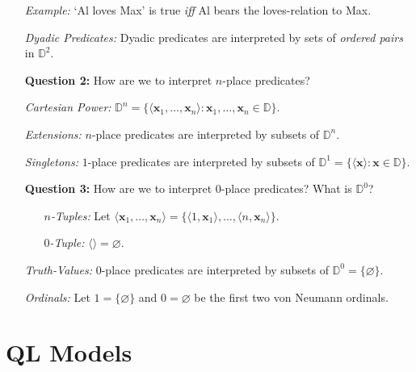 \documentclass[a4paper, 11pt]{article} %
\newcommand{\tuple}[1]{\langle#1\rangle} %
\newcommand{\set}[1]{\lbrace#1\rbrace} %
\newcommand{\D}{\mathbb{D}}
\renewcommand{\v}[1]{\mathbf{#1}}
\begin{document}
\begin{enumerate}
  \item[\it Example:] `Al loves Max' is true \textit{iff} Al bears the loves-relation to Max.
  \item[\it Dyadic Predicates:] Dyadic predicates are interpreted by sets of \textit{ordered pairs} in $\D^2$.
  \item[\bf Question 2:] How are we to interpret $n$-place predicates?
  \item[\it Cartesian Power:] $\D^n=\set{\tuple{\v{x}_1,\ldots,\v{x}_n}:\v{x}_1,\ldots,\v{x}_n\in\D}$.
  \item[\it Extensions:] $n$-place predicates are interpreted by subsets of $\D^n$.
  \item[\it Singletons:] $1$-place predicates are interpreted by subsets of $\D^1=\set{\tuple{\v{x}}:\v{x}\in\D}$.
  \item[\bf Question 3:] How are we to interpret $0$-place predicates? What is $\D^0$?
    \begin{itemize}
      \item[\it $n$-Tuples:] Let $\tuple{\v{x}_1,\ldots,\v{x}_n}=\set{\tuple{1,\v{x}_1},\ldots,\tuple{n,\v{x}_n}}$.
      \item[\it $0$-Tuple:] $\tuple{}=\varnothing$.
      \end{itemize}
  \item[\it Truth-Values:] $0$-place predicates are interpreted by subsets of $\D^0=\set{\varnothing}$.
  \item[\it Ordinals:] Let $1=\set{\varnothing}$ and $0=\varnothing$ be the first two von Neumann ordinals.
\end{enumerate}



\section*{QL Models}
\end{document}
